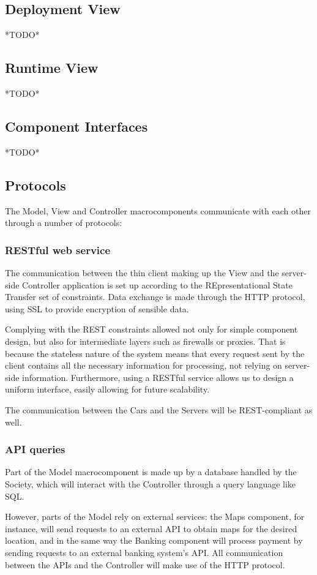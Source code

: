 \documentclass[12pt]{article}
\begin{document}
\subsection{Deployment View}
*TODO*
\subsection{Runtime View}
*TODO*
\subsection{Component Interfaces}
*TODO*

\subsection{Protocols}
The Model, View and Controller macrocomponents communicate with each other through a number of protocols:
\subsubsection{RESTful web service}
The communication between the thin client making up the View and the server-side Controller application is set up according to the REpresentational State Transfer set of constraints. Data exchange is made through the HTTP protocol, using SSL to provide encryption of sensible data.

Complying with the REST constraints allowed not only for simple component design, but also for intermediate layers such as firewalls or proxies. That is because the stateless nature of the system means that every request sent by the client contains all the necessary information for processing, not relying on server-side information. Furthermore, using a RESTful service allows us to design a uniform interface, easily allowing for future scalability.

The communication between the Cars and the Servers will be REST-compliant as well.

\subsubsection{API queries}
Part of the Model macrocomponent is made up by a database handled by the Society, which will interact with the Controller through a query language like SQL.

However, parts of the Model rely on external services: the Maps component, for instance, will send requests to an external API to obtain maps for the desired location, and in the same way the Banking component will process payment by sending requests to an external banking system's API. All communication between the APIs and the Controller will make use of the HTTP protocol.
\end{document}
